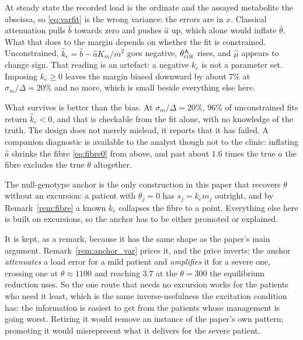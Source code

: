 \begin{remark}
\label{rem:eiv}
At steady state the recorded load is the ordinate and the assayed metabolite the abscissa,
so \eqref{eq:varfit} is the wrong variance: the errors are in $x$. Classical attenuation
pulls $\hat b$ towards zero and pushes $\hat a$ up, which alone would inflate $\hat\theta$.
What that does to the margin depends on whether the fit is constrained. Unconstrained,
$\hat k_e = \hat b - \hat a K_m/\bar m^2$ goes negative, $\theta_{\mathrm{crit}}^{\mathrm{A}}$ rises, and
$\hat\mu$ appears to change sign. That reading is an artefact: a negative $k_e$ is not a
parameter set. Imposing $k_e \ge 0$ leaves the margin biased downward by about $7\%$ at
$\sigma_m/\Delta = 20\%$ and no more, which is small beside everything else here.

What survives is better than the bias. At $\sigma_m/\Delta = 20\%$, $96\%$ of unconstrained
fits return $\hat k_e < 0$, and that is checkable from the fit alone, with no knowledge of
the truth. The design does not merely mislead, it reports that it has failed. A companion
diagnostic is available to the analyst though not to the clinic: inflating $\hat a$ shrinks
the fibre \eqref{eq:fibre0} from above, and past about $1.6$ times the true $a$ the fibre
excludes the true $\theta$ altogether.
\end{remark}

\begin{remark}
\label{rem:anchor_kept}
The null-genotype anchor is the only construction in this paper that recovers $\theta$
without an excursion: a patient with $\theta_j = 0$ has $s_j = k_e m_j$ outright, and by
Remark~\ref{rem:fibre} a known $k_e$ collapses the fibre to a point. Everything else here
is built on excursions, so the anchor has to be either promoted or explained.

It is kept, as a remark, because it has the same shape as the paper's main
argument. Remark~\ref{rem:anchor_var} prices it, and the price inverts: the anchor
\emph{attenuates} a load error for a mild patient and \emph{amplifies} it for a severe one,
crossing one at $\theta \approx 1100$ and reaching $3.7$ at the $\theta = 300$ the
equilibrium reduction uses. So the one route that needs no excursion works for the patients
who need it least, which is the same inverse-usefulness the excitation condition has: the
information is easiest to get from the patients whose management is going worst. Retiring it
would remove an instance of the paper's own pattern; promoting it would misrepresent what it
delivers for the severe patient.
\end{remark}

